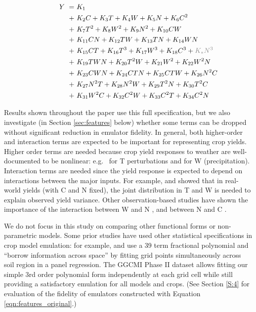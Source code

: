 \documentclass[gmd, manuscript]{copernicus} %
\begin{document}
\vspace{-0.2in}
\begin{align}
    \hspace{10mm}  \label{eqn:features_original}
    Y\ = \ & K_{1}  \\
    + \ & K_{2} C    + K_{3} T     + K_{4} W   + K_{5} N  + K_{6} C^2 \nonumber \\
    + \ & K_{7} T^2  + K_{8} W^2   + K_{9} N^2 + K_{10} C W           \nonumber \\
    + \ & K_{11} C N + K_{12} T W  + K_{13} T N + K_{14} W N          \nonumber \\
    + \ & K_{15} C T + K_{16} T^3  + K_{17} W^3  + K_{18} C^3 + {\color{dark-gray}K_{*} N^3} \nonumber \\
    + \ & K_{19} T W N + K_{20} T^2 W + K_{21} W^2 + K_{22} W^2 N     \nonumber \\
    + \ & K_{23} C W N + K_{24} C T N + K_{25} C T W + K_{26} N^2 C   \nonumber \\
    + \ & K_{27} N^2 T + K_{28} N^2 W + K_{29} T^2 N + K_{30} T^2 C   \nonumber \\
    + \ & K_{31} W^2 C + K_{32} C^2 W + K_{33} C^2 T + K_{34} C^2 N   \nonumber
\end{align}

Results shown throughout the paper use this full specification, but we also investigate (in Section \ref{sec:features} below) whether some terms can be dropped without significant reduction in emulator fidelity.
In general, both higher-order and interaction terms are expected to be important for representing crop yields. Higher order terms are needed because crop yield responses to weather are well-documented to be nonlinear: e.g.\ \citet{Schlenker2009} for T perturbations and \citet{He2016} for W (precipitation). 
Interaction terms are needed since the yield response is expected to depend on interactions between the major inputs. 
For example, \citet{Lobell2007} and \citet{Tebaldi2008} showed that in real-world yields (with C and N fixed), the joint distribution in T and W is needed to explain observed yield variance.  
Other observation-based studies have shown the importance of the interaction between W and N \citep[e.g.][]{AULAKH2005}, and between N and C \citep{Mitsuru92, Nakamura97}.

We do not focus in this study on comparing other functional forms or non-parametric models.
Some prior studies have used other statistical specifications in crop model emulation: for example, \citet{BLANC2015} and \citet{BLANC2017} use a 39 term fractional polynomial and ``borrow information across space'' by fitting grid points simultaneously across soil region in a panel regression. 
The GGCMI Phase II dataset allows fitting our simple 3rd order polynomial form independently at each grid cell while still providing a satisfactory emulation for all models and crops. 
(See Section \ref{S:4} for evaluation of the fidelity of emulators constructed with Equation \ref{eqn:features_original}.)
\end{document}
